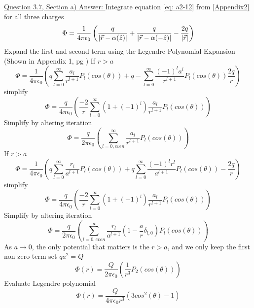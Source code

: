 \documentclass[12pt]{article}
\begin{document}
    \underline{Question 3.7, Section a) Answer: }
    Integrate equation \ref{eq: a2-12} from \ref{Appendix2} for all three charges
    \begin{equation} \label{eq: 3.7-1}
        \Phi = \frac{1}{4 \pi \epsilon_0} \left(\frac{q}{\abs{\vec{r} - \alpha(\hat{z})}} + \frac{q}{\abs{\vec{r}-\alpha(-\hat{z})}} - \frac{2q}{\abs{\vec{r}}} \right)
    \end{equation}
    Expand the first and second term using the Legendre Polynomial Expansion (Shown in Appendix 1, pg \pageref{Appendix1}) 
    \newline If $r>a$
    \begin{equation} \label{eq: 3.7-2}
        \Phi = \frac{1}{4 \pi \epsilon_0} \left(q \sum_{l=0}^\infty \frac{a_l}{r^{l+1}} P_l(cos(\theta)) + q - \sum_{l=0}^\infty \frac{{(-1)}^l a^l}{r^{l+1}} P_l(cos(\theta)) \frac{2q}{r} \right)        
    \end{equation}
    simplify
    \begin{equation} \label{eq: 3.7-3}
        \Phi = \frac{q}{4 \pi \epsilon_0} \left(\frac{-2}{r} \sum_{l=0}^\infty \left(1+{(-1)}^l \right)\frac{a_l}{r^{l+1}} P_l(cos(\theta)) \right)      
    \end{equation}
    Simplify by altering iteration
    \begin{equation} \label{eq: 3.7-4}
        \Phi = \frac{q}{2 \pi \epsilon_0} \left(\sum_{l=0, even}^\infty \frac{a_l}{r^{l+1}} P_l(cos(\theta)) \right)
    \end{equation}
    \newline If $r>a$
    \begin{equation} \label{eq: 3.7-5}
        \Phi = \frac{1}{4 \pi \epsilon_0} \left(q \sum_{l=0}^\infty \frac{r_l}{a^{l+1}} P_l(cos(\theta)) + q \sum_{l=0}^\infty \frac{{(-1)}^l r^l}{a^{l+1}} P_l(cos(\theta)) - \frac{2q}{r} \right)        
    \end{equation}
    simplify
    \begin{equation} \label{eq: 3.7-6}
        \Phi = \frac{q}{4 \pi \epsilon_0} \left(\frac{-2}{r} \sum_{l=0}^\infty \left(1+{(-1)}^l \right)\frac{a_l}{r^{l+1}} P_l(cos(\theta)) \right)      
    \end{equation}
    Simplify by altering iteration
    \begin{equation} \label{eq: 3.7-7}
        \Phi = \frac{q}{2 \pi \epsilon_0} \left(\sum_{l=0, even}^\infty \frac{r_l}{a^{l+1}} \left(1-\frac{a}{r} \delta_{l,0} \right) P_l(cos(\theta)) \right)      
    \end{equation}
    As $a \rightarrow{} 0$, the only potential that matters is the $r>a$, and we only keep the first non-zero term
    \newline set $qa^2 = Q$
    \begin{equation} \label{eq: 3.7-8}
        \Phi(r) = \frac{Q}{2 \pi \epsilon_0} \left(\frac{1}{r^3} P_2(cos(\theta)) \right)
    \end{equation}
    Evaluate Legendre polynomial
    \begin{equation} \label{eq: 3.7-9}
        \Phi(r) = \frac{Q}{4 \pi \epsilon_0 r^3} (3 cos^2(\theta) - 1)
    \end{equation}
    
\end{document}
